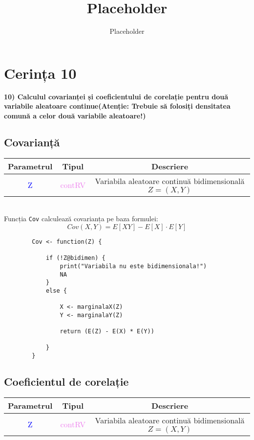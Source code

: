 \documentclass[12pt]{article}
\title{Placeholder}
\author{Placeholder}
\begin{document}
	\section{Cerința 10}
	\textbf{10) Calculul covarianței și coeficientului de corelație pentru două variabile aleatoare
		continue(Atenție: Trebuie să folosiți densitatea comună a celor două variabile
		aleatoare!)
}\vspace{5mm}
	
	\subsection{Covarianță}
	\begin{center}
		\begin{tabular}{|| c | c | c ||}
			\hline
			Parametrul & Tipul & Descriere \\
			\hline
			\textcolor{blue}{Z} & \textcolor{violet}{contRV} & Variabila aleatoare continuă bidimensională $Z = (X, Y)$ \\
			
			\hline
		\end{tabular}
	\end{center}\hfill \\

	Funcția \texttt{Cov} calculează covarianța pe baza formulei:
	\begin{equation*}
		Cov(X, Y) = E[XY] - E[X] \cdot E[Y]
	\end{equation*}

	\begin{lstlisting}
		Cov <- function(Z) {
			
			if (!Z@bidimen) {
				print("Variabila nu este bidimensionala!")
				NA
			}
			else {
				
				X <- marginalaX(Z)
				Y <- marginalaY(Z)
				
				return (E(Z) - E(X) * E(Y))
				
			}
		}
	\end{lstlisting}

	\subsection{Coeficientul de corelație}
	\begin{center}
		\begin{tabular}{|| c | c | c ||}
			\hline
			Parametrul & Tipul & Descriere \\
			\hline
			\textcolor{blue}{Z} & \textcolor{violet}{contRV} & Variabila aleatoare continuă bidimensională $Z = (X, Y)$ \\
			
			\hline
		\end{tabular}
	\end{center}\hfill \\
	
\end{document}
